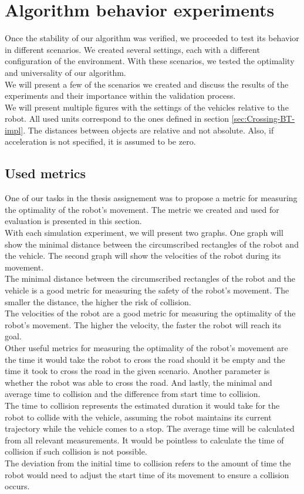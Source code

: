 \section{Algorithm behavior experiments}
    Once the stability of our algorithm was verified, we proceeded to test its behavior in different scenarios. We created several settings, each with a different configuration of the environment. With these scenarios, we tested the optimality and universality of our algorithm.\\
    We will present a few of the scenarios we created and discuss the results of the experiments and their importance within the validation process.\\
    We will present multiple figures with the settings of the vehicles relative to the robot. All used units correspond to the ones defined in section \ref{sec:Crossing-BT-impl}. The distances between objects are relative and not absolute. Also, if acceleration is not specified, it is assumed to be zero.\\
    \subsection{Used metrics}
        One of our tasks in the thesis assignement was to propose a metric for measuring the optimality of the robot's movement. The metric we created and used for evaluation is presented in this section.\\
        With each simulation experiment, we will present two graphs. One graph will show the minimal distance between the circumscribed rectangles of the robot and the vehicle. The second graph will show the velocities of the robot during its movement.\\
        The minimal distance between the circumscribed rectangles of the robot and the vehicle is a good metric for measuring the safety of the robot's movement. The smaller the distance, the higher the risk of collision.\\
        The velocities of the robot are a good metric for measuring the optimality of the robot's movement. The higher the velocity, the faster the robot will reach its goal.\\
        Other useful metrics for measuring the optimality of the robot's movement are the time it would take the robot to cross the road should it be empty and the time it took to cross the road in the given scenario. Another parameter is whether the robot was able to cross the road. And lastly, the minimal and average time to collision and the difference from start time to collision.\\
        The time to collision represents the estimated duration it would take for the robot to collide with the vehicle, assuming the robot maintains its current trajectory while the vehicle comes to a stop. The average time will be calculated from all relevant measurements. It would be pointless to calculate the time of collision if such collision is not possible.\\
        The deviation from the initial time to collision refers to the amount of time the robot would need to adjust the start time of its movement to ensure a collision occurs.
